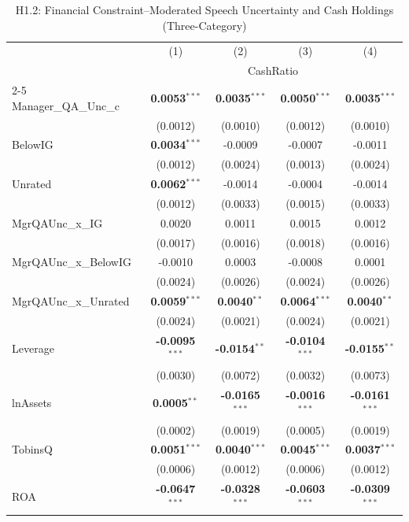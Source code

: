 \documentclass[11pt,a4paper]{article}
\begin{document}
\begin{table}[htbp]
\centering
\caption{H1.2: Financial Constraint--Moderated Speech Uncertainty and Cash Holdings (Three-Category)}
\label{tab:h1_2}
\scriptsize
\begin{tabular}{lcccc}
\toprule
 & (1) & (2) & (3) & (4) \\
 & \multicolumn{4}{c}{CashRatio} \\
\cmidrule(lr){2-5}
\midrule
Manager\_QA\_Unc\_c & \textbf{0.0053}$^{***}$ & \textbf{0.0035}$^{***}$ & \textbf{0.0050}$^{***}$ & \textbf{0.0035}$^{***}$ \\
 & (0.0012) & (0.0010) & (0.0012) & (0.0010) \\
BelowIG & \textbf{0.0034}$^{***}$ & -0.0009 & -0.0007 & -0.0011 \\
 & (0.0012) & (0.0024) & (0.0013) & (0.0024) \\
Unrated & \textbf{0.0062}$^{***}$ & -0.0014 & -0.0004 & -0.0014 \\
 & (0.0012) & (0.0033) & (0.0015) & (0.0033) \\
MgrQAUnc\_x\_IG & 0.0020 & 0.0011 & 0.0015 & 0.0012 \\
 & (0.0017) & (0.0016) & (0.0018) & (0.0016) \\
MgrQAUnc\_x\_BelowIG & -0.0010 & 0.0003 & -0.0008 & 0.0001 \\
 & (0.0024) & (0.0026) & (0.0024) & (0.0026) \\
MgrQAUnc\_x\_Unrated & \textbf{0.0059}$^{***}$ & \textbf{0.0040}$^{**}$ & \textbf{0.0064}$^{***}$ & \textbf{0.0040}$^{**}$ \\
 & (0.0024) & (0.0021) & (0.0024) & (0.0021) \\
\midrule
Leverage & \textbf{-0.0095}$^{***}$ & \textbf{-0.0154}$^{**}$ & \textbf{-0.0104}$^{***}$ & \textbf{-0.0155}$^{**}$ \\
 & (0.0030) & (0.0072) & (0.0032) & (0.0073) \\
lnAssets & \textbf{0.0005}$^{**}$ & \textbf{-0.0165}$^{***}$ & \textbf{-0.0016}$^{***}$ & \textbf{-0.0161}$^{***}$ \\
 & (0.0002) & (0.0019) & (0.0005) & (0.0019) \\
TobinsQ & \textbf{0.0051}$^{***}$ & \textbf{0.0040}$^{***}$ & \textbf{0.0045}$^{***}$ & \textbf{0.0037}$^{***}$ \\
 & (0.0006) & (0.0012) & (0.0006) & (0.0012) \\
ROA & \textbf{-0.0647}$^{***}$ & \textbf{-0.0328}$^{***}$ & \textbf{-0.0603}$^{***}$ & \textbf{-0.0309}$^{***}$ \\

\end{tabular}
\end{table}
\end{document}
